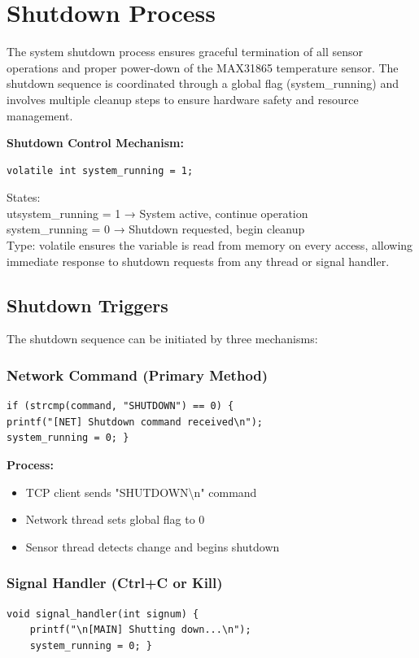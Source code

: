 \section{Shutdown Process}
The system shutdown process ensures graceful termination of all sensor operations and proper power-down of the MAX31865 temperature sensor. The shutdown sequence is coordinated through a global flag (system\_running) and involves multiple cleanup steps to ensure hardware safety and resource management.

\textbf{Shutdown Control Mechanism: }
\begin{verbatim}
volatile int system_running = 1;
\end{verbatim}

States:\\
utsystem\_running = 1 → System active, continue operation\\
system\_running = 0 → Shutdown requested, begin cleanup\\
Type: volatile ensures the variable is read from memory on every access, allowing immediate response to shutdown requests from any thread or signal handler.

\subsection{Shutdown Triggers}
The shutdown sequence can be initiated by three mechanisms:

\subsubsection{Network Command (Primary Method)}
\begin{verbatim}
if (strcmp(command, "SHUTDOWN") == 0) { 
printf("[NET] Shutdown command received\n"); 
system_running = 0; }
\end{verbatim}

\textbf{Process:}
\begin{itemize}
\item TCP client sends "SHUTDOWN\textbackslash n" command
\item Network thread sets global flag to 0
\item Sensor thread detects change and begins shutdown
\end{itemize}

\subsubsection{Signal Handler (Ctrl+C or Kill)}
\begin{verbatim}
void signal_handler(int signum) {
    printf("\n[MAIN] Shutting down...\n");
    system_running = 0; }
\end{verbatim}

